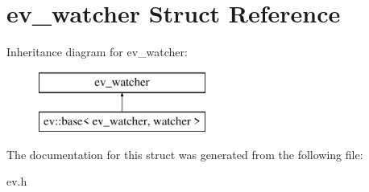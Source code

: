 \hypertarget{structev__watcher}{}\section{ev\+\_\+watcher Struct Reference}
\label{structev__watcher}
Inheritance diagram for ev\+\_\+watcher\+:\begin{figure}[H]
\begin{center}
\leavevmode
\includegraphics[height=2.000000cm]{structev__watcher}
\end{center}
\end{figure}


The documentation for this struct was generated from the following file\+:\begin{DoxyCompactItemize}
\item 
ev.\+h\end{DoxyCompactItemize}
